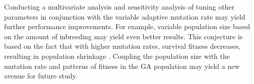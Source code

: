 \documentclass[conference]{IEEEtran}
\begin{document}
Conducting a multivariate analysis and sensitivity analysis of tuning other parameters in conjunction with the variable adaptive mutation rate may yield further performance improvements. For example, variable population size based on the amount of inbreeding may yield even better results. This conjecture is based on the fact that with higher mutation rates, survival fitness decreases, resulting in population shrinkage \cite{cit:9}. Coupling the population size with the mutation rate and patterns of fitness in the GA population may yield a new avenue for future study.




%
%
%
\end{document}

